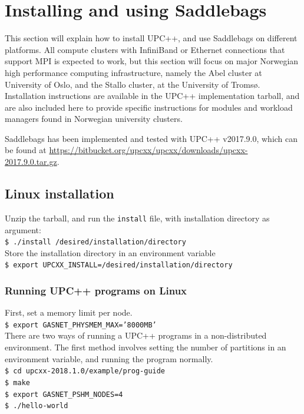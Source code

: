 \documentclass{uit-report}
\begin{document}
\pagebreak



\appendix
\chapter{Installing and using Saddlebags}
This section will explain how to install UPC++, and use Saddlebags on different platforms. All compute clusters with InfiniBand or Ethernet connections that support MPI is expected to work, but this section will focus on major Norwegian high performance computing infrastructure, namely the Abel cluster at University of Oslo, and the Stallo cluster, at the University of Tromsø. Installation instructions are available in the UPC++ implementation tarball, and are also included here to provide specific instructions for modules and workload managers found in Norwegian university clusters.

Saddlebags has been implemented and tested with UPC++ v2017.9.0, which can be found at {\url{https://bitbucket.org/upcxx/upcxx/downloads/upcxx-2017.9.0.tar.gz}}.
\section{Linux installation}\label{section:installinux}
Unzip the tarball, and run the \texttt{install} file, with installation directory as argument:\\
\phantom{11111} \texttt{\$ ./install /desired/installation/directory}\\
Store the installation directory in an environment variable\\
\phantom{11111} \texttt{\$ export UPCXX\_INSTALL=/desired/installation/directory}\\
\subsection{Running UPC++ programs on Linux}\label{section:runlinux}
First, set a memory limit per node.\\
\phantom{11111} \texttt{\$ export GASNET\_PHYSMEM\_MAX='8000MB'}\\



There are two ways of running a UPC++ programs in a non-distributed environment. The first method involves setting the number of partitions in an environment variable, and running the program normally.\\
\phantom{11111} \texttt{\$ cd upcxx-2018.1.0/example/prog-guide}\\
\phantom{11111} \texttt{\$ make}\\
\phantom{11111} \texttt{\$ export GASNET\_PSHM\_NODES=4}\\
\phantom{11111} \texttt{\$ ./hello-world}\\
\end{document}

